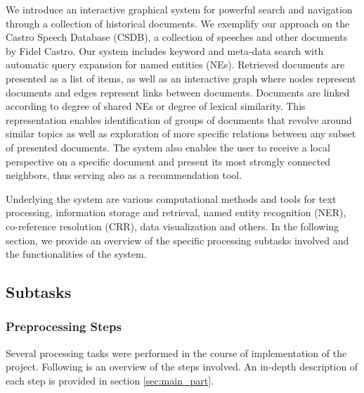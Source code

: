 We introduce an interactive graphical system for powerful search and navigation through a collection of historical documents. 
We exemplify our approach on the Castro Speech Database  (CSDB), a collection of speeches and other documents by Fidel Castro. Our system includes keyword and meta-data search with automatic query 
expansion for named entities (NEs). Retrieved documents are presented as a list of items, as well as an interactive graph where nodes represent 
documents and edges represent links between documents. Documents are linked according to degree of shared NEs or degree of lexical 
similarity. This representation enables identification of groups of documents that revolve around similar topics as well as exploration of 
more specific relations between any subset of presented documents. The system also enables the user to receive a local perspective on a 
specific document and present its most strongly connected neighbors, thus serving also as a recommendation tool. 

Underlying the system are various computational methods and tools for text processing, 
information storage and retrieval, named entity recognition (NER), co-reference resolution (CRR), 
data visualization and others. In the following section, we provide an overview of the specific processing subtasks involved and the functionalities of the system.

\subsection{Subtasks}
\label{sec:subtasks}
\subsubsection{Preprocessing Steps}
Several processing tasks were performed in the course of implementation of the project. Following is an overview of the steps involved. An in-depth description of each step is provided in section \ref{sec:main_part}.

